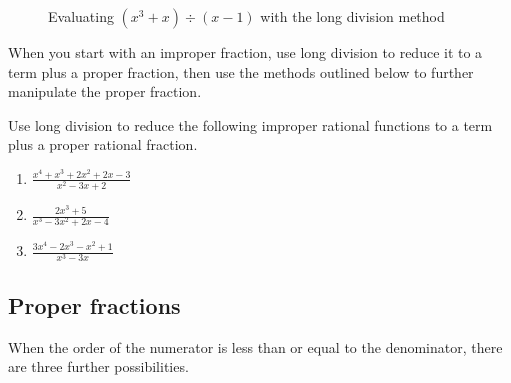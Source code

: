 \begin{figure}[htbp]
\centering
    \caption{Evaluating $(x^3 + x) \div (x - 1)$ with the long division method}
    \label{polylongdiv}
\end{figure}

When you start with an improper fraction, use long division to reduce it to a 
term plus a proper fraction, then use the methods outlined below to further 
manipulate the proper fraction. 

\begin{Exercise}[label = improper]
Use long division to reduce the following improper rational functions to a term plus a proper rational fraction.
\begin{enumerate}
\item $\frac{x^4 + x^3 + 2x^2 + 2x - 3}{x^2 - 3x + 2}$
\item $\frac{2x^3 + 5}{x^3 - 3x^2 + 2x - 4}$
\item $\frac{3x^4 - 2x^3 - x^2 + 1}{x^3 - 3x}$
\end{enumerate}
\end{Exercise}

\begin{Answer}[ref = improper]

\end{Answer}

\subsection{Proper fractions}
When the order of the numerator is less than or equal to the denominator, 
there are three further possibilities. 

